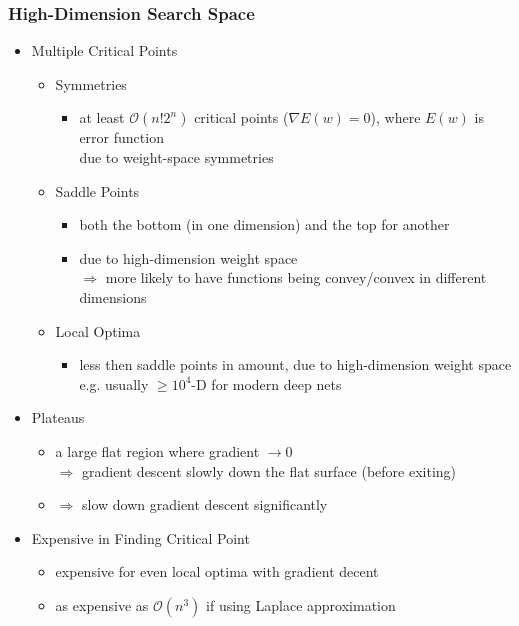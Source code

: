 \subsubsection{High-Dimension Search Space}
\begin{itemize}
\item Multiple Critical Points
	\begin{itemize}
	\item Symmetries
		\begin{itemize}
		\item at least $\mathcal O (n!2^n)$ critical points ($\nabla E(w) = 0$), where $E(w)$ is error function \\
		due to weight-space symmetries
		\end{itemize}
	\item Saddle Points
		\begin{itemize}
		\item both the bottom (in one dimension) and the top for another
		\item due to high-dimension weight space \\ 
		$\Rightarrow$ more likely to have functions being convey/convex in different dimensions
		\end{itemize}
	\item Local Optima
		\begin{itemize}
		\item less then saddle points in amount, due to high-dimension weight space \\ 
		e.g. usually $\ge 10^4$-D for modern deep nets
		\end{itemize}
	\end{itemize}
\item Plateaus
	\begin{itemize}
	\item a large flat region where gradient $\rightarrow 0$ \\
	$\Rightarrow$ gradient descent slowly down the flat surface (before exiting)
	\item $\Rightarrow$ slow down gradient descent significantly
	\end{itemize}
\item Expensive in Finding Critical Point
	\begin{itemize}
	\item expensive for even local optima with gradient decent
	\item as expensive as $\mathcal O(n^3)$ if using Laplace approximation
	\end{itemize}	
\end{itemize}

